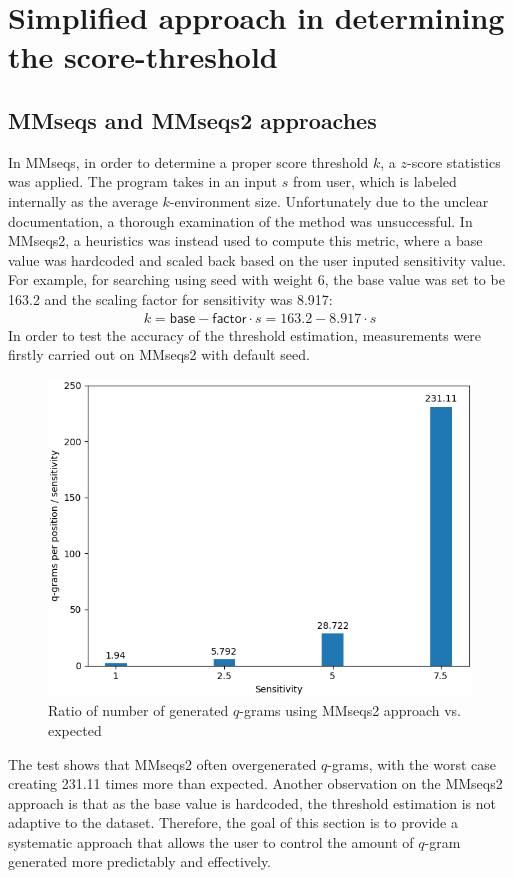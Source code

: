 \documentclass[twoside,a4paper,bsc]{master}
\newcommand{\Qgram}[1]{\(#1\)-gram}
\begin{document}
\section{Simplified approach in determining the score-threshold}
\subsection{MMseqs and MMseqs2 approaches}
In MMseqs, in order to determine a proper score threshold \(k\),
a \(z\)-score statistics was applied. The program takes in an input \(s\)
from
user, which is labeled internally as the average \(k\)-environment size.
Unfortunately due to the unclear documentation, a thorough examination of
the
method was unsuccessful.
In MMseqs2, a heuristics was instead used to compute this metric,
where a base value was hardcoded and scaled back based on the user inputed
sensitivity value. For example, for searching using seed with weight 6, the
base
value was set to be 163.2 and the scaling factor for sensitivity was 8.917:
\begin{align}
k = \mathsf{base} - \mathsf{factor}\cdot s = 163.2 - 8.917 \cdot s
\end{align}
In order to test the accuracy of the threshold estimation, measurements
were firstly carried out on MMseqs2 with default seed.
\begin{figure}
\centering
\includegraphics[scale=0.6]{graphics/mmseqs2_sensitivity.png}
\caption{Ratio of number of generated \Qgram{q}s using MMseqs2 approach
vs. expected}
\label{fig:mmseqssens}
\end{figure}
The test shows that MMseqs2 often overgenerated \Qgram{q}s, with the worst
case creating 231.11 times more than expected. Another observation on the
MMseqs2 approach is that as the base value is hardcoded, the threshold
estimation is not adaptive to the dataset. Therefore, the goal of this
section
is to provide a systematic approach that allows the user to control the
amount
of \Qgram{q} generated more predictably and effectively.
\end{document}

